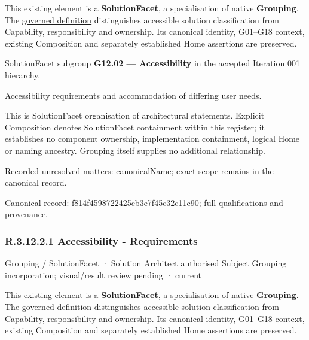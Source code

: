 This existing element is a \textbf{SolutionFacet}, a specialisation of native
\textbf{Grouping}. The \href{\detokenize{../../../../../../../governance/continuum-representation.md#solutionfacet-classification--1119-candidate}}{governed definition}
distinguishes accessible solution classification from Capability, responsibility
and ownership. Its canonical identity, G01–G18 context, existing Composition
and separately established Home assertions are preserved.



SolutionFacet subgroup \textbf{G12.02 — Accessibility} in the accepted Iteration 001 hierarchy.



Accessibility requirements and accommodation of differing user needs.



This is SolutionFacet organisation of architectural statements. Explicit Composition denotes SolutionFacet containment within this register; it establishes no component ownership, implementation containment, logical Home or naming ancestry. Grouping itself supplies no additional relationship.


{\small Recorded unresolved matters: canonicalName; exact scope remains in the canonical record.}\par
{\footnotesize \href{../../../../../../../continuum/grouping/f814f4598722425cb3e7f45c32c11c90.md}{Canonical record: f814f4598722425cb3e7f45c32c11c90}; full qualifications and provenance.}\par
\subsubsection*{R.3.12.2.1 Accessibility - Requirements}
\label{navigation:R.3.12.2.1}

\label{element:23408174240a47f690d23dee589e4ddc}
{\small Grouping / SolutionFacet · Solution Architect authorised Subject Grouping incorporation; visual/result review pending · current}\par

This existing element is a \textbf{SolutionFacet}, a specialisation of native
\textbf{Grouping}. The \href{\detokenize{../../../../../../../governance/continuum-representation.md#solutionfacet-classification--1119-candidate}}{governed definition}
distinguishes accessible solution classification from Capability, responsibility
and ownership. Its canonical identity, G01–G18 context, existing Composition
and separately established Home assertions are preserved.



